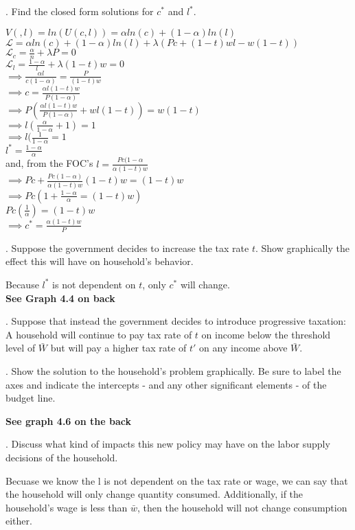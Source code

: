 \documentclass[11pt]{SelfArxOneColBMN}
\begin{document}
. Find the closed form solutions for $c^*$ and $l^*$.
	\begin{solution}
		$V(,l) = ln(U(c,l)) = \alpha ln(c) + (1 - \alpha)ln(l)$\\
		$\mathcal{L} = \alpha ln(c) + (1 - \alpha)ln(l) + \lambda(Pc + (1 - t)wl - w(1 - t))$\\
		$\mathcal{L}_c = \frac{\alpha}{n} + \lambda P = 0$\\
		$\mathcal{L}_l = \frac{1 - \alpha}{l} + \lambda (1 - t)w = 0$\\
		$\implies \frac{\alpha l}{c(1 - \alpha)} = \frac{P}{(1 - t)w}$\\
		$\implies c = \frac{\alpha l(1 - t)w}{P(1 - \alpha)}$\\
		$\implies P(\frac{\alpha l(1 - t)w}{P(1 - \alpha)} + wl(1 - t)) = w(1 - t)$\\
		$\implies l(\frac{\alpha}{1 - \alpha} + 1) = 1$\\
		$\implies l(\frac{1}{1 - \alpha} = 1$\\
		$l^* = \frac{1 - \alpha}{\alpha}$\\
		and, from the FOC's
		$l = \frac{Pc(1 - \alpha}{\alpha (1 - t)w}$\\
		$\implies Pc + \frac{Pc(1 - \alpha)}{\alpha (1 - t)w}(1 - t)w = (1 - t)w$\\
		$\implies Pc(1 + \frac{1 - \alpha}{\alpha} = (1 - t)w)$\\
		$Pc(\frac{1}{\alpha}) = (1 - t)w$\\
		$\implies c^* = \frac{\alpha (1 - t)w}{P}$
	\end{solution}

. Suppose the government decides to increase the tax rate $t$. Show graphically the effect this will have on household's behavior. 
	\begin{solution}
		Because $l^*$ is not dependent on $t$, only $c^*$ will change.\\
		\textbf{See Graph 4.4 on back}
	\end{solution}
. Suppose that instead the government decides to introduce progressive taxation: A household will continue to pay tax rate of $t$ on income below the threshold level of $\bar{W}$ but will pay a higher tax rate of $t'$ on any income above $\bar{W}$. 

. Show the solution to the household's problem graphically. Be sure to label the axes and indicate the intercepts - and any other significant elements - of the budget line.
	\begin{solution}
		\textbf{See graph 4.6 on the back}
	\end{solution}
. Discuss what kind of impacts this new policy may have on the labor supply decisions of the household.
	\begin{solution}
		Becuase we know the l is not dependent on the tax rate or wage, we can say that the household will only change quantity consumed. Additionally, if the household's wage is less than $\bar{w}$, then the household will not change consumption either.
	\end{solution}
\end{document}
